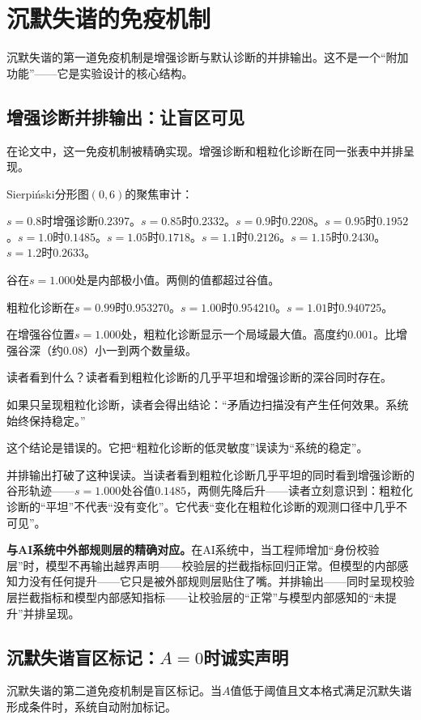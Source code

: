 \documentclass[11pt,a4paper]{book}
\theoremstyle{definition}
\begin{document}
\section{沉默失谐的免疫机制}

沉默失谐的第一道免疫机制是增强诊断与默认诊断的并排输出。这不是一个“附加功能”——它是实验设计的核心结构。

\subsection{增强诊断并排输出：让盲区可见}

在论文中，这一免疫机制被精确实现。增强诊断和粗粒化诊断在同一张表中并排呈现。

Sierpiński分形图$(0,6)$的聚焦审计：

$s=0.8$时增强诊断$0.2397$。$s=0.85$时$0.2332$。$s=0.9$时$0.2208$。$s=0.95$时$0.1952$。$s=1.0$时$0.1485$。$s=1.05$时$0.1718$。$s=1.1$时$0.2126$。$s=1.15$时$0.2430$。$s=1.2$时$0.2633$。

谷在$s=1.000$处是内部极小值。两侧的值都超过谷值。

粗粒化诊断在$s=0.99$时$0.953270$。$s=1.00$时$0.954210$。$s=1.01$时$0.940725$。

在增强谷位置$s=1.000$处，粗粒化诊断显示一个局域最大值。高度约$0.001$。比增强谷深（约$0.08$）小一到两个数量级。

读者看到什么？读者看到粗粒化诊断的几乎平坦和增强诊断的深谷同时存在。

如果只呈现粗粒化诊断，读者会得出结论：“矛盾边扫描没有产生任何效果。系统始终保持稳定。”

这个结论是错误的。它把“粗粒化诊断的低灵敏度”误读为“系统的稳定”。

并排输出打破了这种误读。当读者看到粗粒化诊断几乎平坦的同时看到增强诊断的谷形轨迹——$s=1.000$处谷值$0.1485$，两侧先降后升——读者立刻意识到：粗粒化诊断的“平坦”不代表“没有变化”。它代表“变化在粗粒化诊断的观测口径中几乎不可见”。

\textbf{与AI系统中外部规则层的精确对应。}在AI系统中，当工程师增加“身份校验层”时，模型不再输出越界声明——校验层的拦截指标回归正常。但模型的内部感知力没有任何提升——它只是被外部规则层贴住了嘴。并排输出——同时呈现校验层拦截指标和模型内部感知指标——让校验层的“正常”与模型内部感知的“未提升”并排呈现。

\subsection{沉默失谐盲区标记：$A=0$时诚实声明}

沉默失谐的第二道免疫机制是盲区标记。当$A$值低于阈值且文本格式满足沉默失谐形成条件时，系统自动附加标记。
\end{document}
